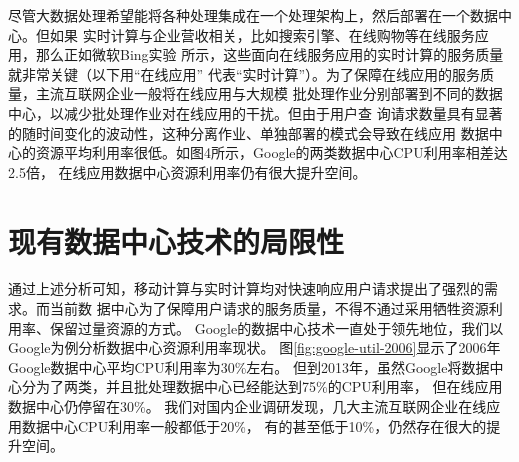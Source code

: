尽管大数据处理希望能将各种处理集成在一个处理架构上，然后部署在一个数据中心。但如果
实时计算与企业营收相关，比如搜索引擎、在线购物等在线服务应用，那么正如微软Bing实验
所示，这些面向在线服务应用的实时计算的服务质量就非常关键（以下用“在线应用”
代表“实时计算”）。为了保障在线应用的服务质量，主流互联网企业一般将在线应用与大规模
批处理作业分别部署到不同的数据中心，以减少批处理作业对在线应用的干扰。但由于用户查
询请求数量具有显著的随时间变化的波动性，这种分离作业、单独部署的模式会导致在线应用
数据中心的资源平均利用率很低。如图4所示，Google的两类数据中心CPU利用率相差达2.5倍，
在线应用数据中心资源利用率仍有很大提升空间。




\section{现有数据中心技术的局限性}

通过上述分析可知，移动计算与实时计算均对快速响应用户请求提出了强烈的需求。而当前数
据中心为了保障用户请求的服务质量，不得不通过采用牺牲资源利用率、保留过量资源的方式。
Google的数据中心技术一直处于领先地位，我们以Google为例分析数据中心资源利用率现状。
图\ref{fig:google-util-2006}显示了2006年Google数据中心平均CPU利用率为30\%左右。
但到2013年，虽然Google将数据中心分为了两类，并且批处理数据中心已经能达到75\%的CPU利用率，
但在线应用数据中心仍停留在30\%。
我们对国内企业调研发现，几大主流互联网企业在线应用数据中心CPU利用率一般都低于20\%，
有的甚至低于10\%，仍然存在很大的提升空间。

